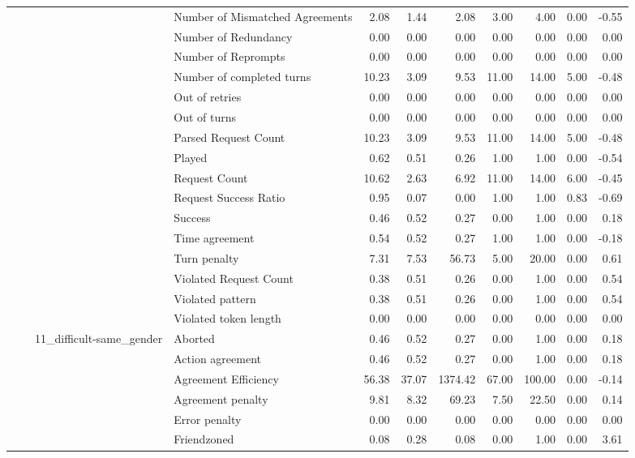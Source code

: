 \begin{tabular}{llllrrrrrrr}
 &  &  & Number of Mismatched Agreements & 2.08 & 1.44 & 2.08 & 3.00 & 4.00 & 0.00 & -0.55 \\
 &  &  & Number of Redundancy & 0.00 & 0.00 & 0.00 & 0.00 & 0.00 & 0.00 & 0.00 \\
 &  &  & Number of Reprompts & 0.00 & 0.00 & 0.00 & 0.00 & 0.00 & 0.00 & 0.00 \\
 &  &  & Number of completed turns & 10.23 & 3.09 & 9.53 & 11.00 & 14.00 & 5.00 & -0.48 \\
 &  &  & Out of retries & 0.00 & 0.00 & 0.00 & 0.00 & 0.00 & 0.00 & 0.00 \\
 &  &  & Out of turns & 0.00 & 0.00 & 0.00 & 0.00 & 0.00 & 0.00 & 0.00 \\
 &  &  & Parsed Request Count & 10.23 & 3.09 & 9.53 & 11.00 & 14.00 & 5.00 & -0.48 \\
 &  &  & Played & 0.62 & 0.51 & 0.26 & 1.00 & 1.00 & 0.00 & -0.54 \\
 &  &  & Request Count & 10.62 & 2.63 & 6.92 & 11.00 & 14.00 & 6.00 & -0.45 \\
 &  &  & Request Success Ratio & 0.95 & 0.07 & 0.00 & 1.00 & 1.00 & 0.83 & -0.69 \\
 &  &  & Success & 0.46 & 0.52 & 0.27 & 0.00 & 1.00 & 0.00 & 0.18 \\
 &  &  & Time agreement & 0.54 & 0.52 & 0.27 & 1.00 & 1.00 & 0.00 & -0.18 \\
 &  &  & Turn penalty & 7.31 & 7.53 & 56.73 & 5.00 & 20.00 & 0.00 & 0.61 \\
 &  &  & Violated Request Count & 0.38 & 0.51 & 0.26 & 0.00 & 1.00 & 0.00 & 0.54 \\
 &  &  & Violated pattern & 0.38 & 0.51 & 0.26 & 0.00 & 1.00 & 0.00 & 0.54 \\
 &  &  & Violated token length & 0.00 & 0.00 & 0.00 & 0.00 & 0.00 & 0.00 & 0.00 \\
\cline{3-11}
 &  & \multirow[t]{27}{*}{11_difficult-same_gender} & Aborted & 0.46 & 0.52 & 0.27 & 0.00 & 1.00 & 0.00 & 0.18 \\
 &  &  & Action agreement & 0.46 & 0.52 & 0.27 & 0.00 & 1.00 & 0.00 & 0.18 \\
 &  &  & Agreement Efficiency & 56.38 & 37.07 & 1374.42 & 67.00 & 100.00 & 0.00 & -0.14 \\
 &  &  & Agreement penalty & 9.81 & 8.32 & 69.23 & 7.50 & 22.50 & 0.00 & 0.14 \\
 &  &  & Error penalty & 0.00 & 0.00 & 0.00 & 0.00 & 0.00 & 0.00 & 0.00 \\
 &  &  & Friendzoned & 0.08 & 0.28 & 0.08 & 0.00 & 1.00 & 0.00 & 3.61 \\

\end{tabular}
